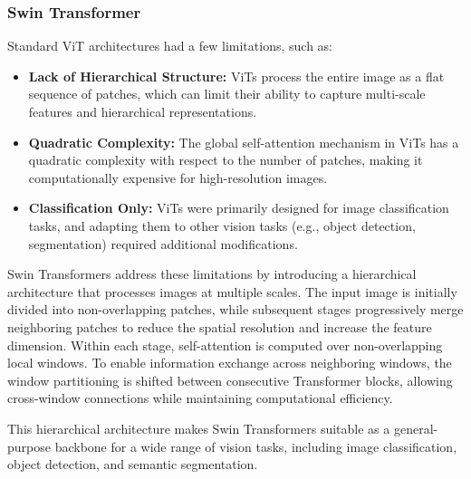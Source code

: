 \subsubsection{Swin Transformer}
Standard ViT architectures had a few limitations, such as:
\begin{itemize}
    \item \textbf{Lack of Hierarchical Structure:} ViTs process the entire image as a flat sequence of patches, 
    which can limit their ability to capture multi-scale features and hierarchical representations.
    \item \textbf{Quadratic Complexity:} The global self-attention mechanism in ViTs has a quadratic complexity with respect to the number of patches, 
    making it computationally expensive for high-resolution images.
    \item \textbf{Classification Only:} ViTs were primarily designed for image classification tasks, 
    and adapting them to other vision tasks (e.g., object detection, segmentation) required additional modifications.
\end{itemize}

Swin Transformers address these limitations by introducing a hierarchical architecture that processes images at multiple scales.
The input image is initially divided into non-overlapping patches, while subsequent stages progressively merge neighboring patches to reduce the spatial resolution and increase the feature dimension.
Within each stage, self-attention is computed over non-overlapping local windows.
To enable information exchange across neighboring windows, the window partitioning is shifted between consecutive Transformer blocks, 
allowing cross-window connections while maintaining computational efficiency.

This hierarchical architecture makes Swin Transformers suitable as a general-purpose backbone for a wide range of vision tasks, including image classification, object detection, and semantic segmentation.